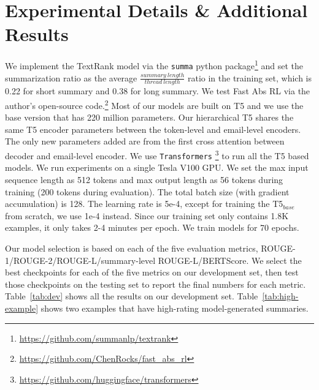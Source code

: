 \section{Experimental Details \& Additional Results}
\label{appedix:exp}
We implement the TextRank \cite{mihalcea2004textrank} model via the \texttt{summa} python package\footnote{\url{https://github.com/summanlp/textrank}} and set the summarization ratio as the average $\frac{summary\ length}{thread\ length}$ ratio in the training set, which is 0.22 for short summary and 0.38 for long summary. We test Fast Abs RL \cite{chen2018fast} via the author's open-source code.\footnote{\url{https://github.com/ChenRocks/fast_abs_rl}} Most of our models are built on T5 \cite{raffel2020exploring} and we use the base version that has 220 million parameters. Our hierarchical T5 shares the same T5 encoder parameters between the token-level and email-level encoders. The only new parameters added are from the first cross attention between decoder and email-level encoder. We use \texttt{Transformers} \cite{wolf-etal-2020-transformers}\footnote{\url{https://github.com/huggingface/transformers}} to run all the T5 based models. We run experiments on a single Tesla V100 GPU. We set the max input sequence length as 512 tokens and max output length as 56 tokens during training (200 tokens during evaluation). The total batch size (with gradient accumulation) is 128. The learning rate is 5e-4, except for training the T5$_{base}$ from scratch, we use 1e-4 instead. Since our training set only contains 1.8K examples,  it only takes 2-4 minutes per epoch. We train models for 70 epochs. 

Our model selection is based on each of the five evaluation metrics, ROUGE-1/ROUGE-2/ROUGE-L/summary-level ROUGE-L/BERTScore. We select the best checkpoints for each of the five metrics on our development set, then test those checkpoints on the testing set to report the final numbers for each metric. Table~\ref{tab:dev}
shows all the results on our development set. Table~\ref{tab:high-example} shows two examples that have high-rating model-generated summaries. 


